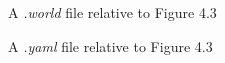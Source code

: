 \documentclass[a4paper, onecolumn]{report}
\begin{document}
\begin{figure}[htbp]
\centering
{}
\caption{A \emph{.world} file relative to Figure 4.3}
\end{figure}

\begin{figure}[htbp]
\centering
{}
\caption{A \emph{.yaml} file relative to Figure 4.3}
\end{figure}
\end{document}
